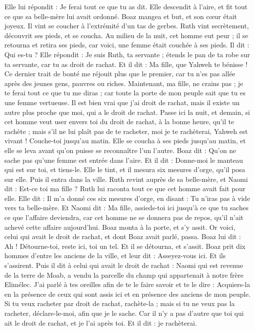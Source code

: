 \begin{multicols}{2}
Elle lui répondit : Je ferai tout ce que tu as dit.
Elle descendit à l'aire, et fit tout ce que sa belle-mère lui avait ordonné.
Boaz mangea et but, et son cœur était joyeux. Il vint se coucher à l'extrémité d'un tas de gerbes. Ruth vint secrètement, découvrit ses pieds, et se coucha.
Au milieu de la nuit, cet homme eut peur ; il se retourna et retira ses pieds, car voici, une femme était couchée à ses pieds.
Il dit : Qui es-tu ? Elle répondit : Je suis Ruth, ta servante ; étends le pan de ta robe sur ta servante, car tu as droit de rachat.
Et il dit : Ma fille, que Yahweh te bénisse ! Ce dernier trait de bonté me réjouit plus que le premier, car tu n'es pas allée après des jeunes gens, pauvres ou riches.
Maintenant, ma fille, ne crains pas ; je te ferai tout ce que tu me diras ; car toute la porte de mon peuple sait que tu es une femme vertueuse.
Il est bien vrai que j'ai droit de rachat, mais il existe un autre plus proche que moi, qui a le droit de rachat.
Passe ici la nuit, et demain, si cet homme veut user envers toi du droit de rachat, à la bonne heure, qu'il te rachète ; mais s'il ne lui plaît pas de te racheter, moi je te rachèterai, Yahweh est vivant ! Couche-toi jusqu'au matin.
Elle se coucha à ses pieds jusqu'au matin, et elle se leva avant qu'on puisse se reconnaître l'un l'autre. Boaz dit : Qu'on ne sache pas qu'une femme est entrée dans l'aire.
Et il dit : Donne-moi le manteau qui est sur toi, et tiens-le. Elle le tint, et il mesura six mesures d'orge, qu'il posa sur elle. Puis il entra dans la ville.
Ruth revint auprès de sa belle-mère, et Naomi dit : Est-ce toi ma fille ? Ruth lui raconta tout ce que cet homme avait fait pour elle.
Elle dit : Il m'a donné ces six mesures d'orge, en disant : Tu n'iras pas à vide vers ta belle-mère.
Et Naomi dit : Ma fille, assieds-toi ici jusqu'à ce que tu saches ce que l'affaire deviendra, car cet homme ne se donnera pas de repos, qu'il n'ait achevé cette affaire aujourd'hui.
\VerseOne{}Boaz monta à la porte, et s'y assit. Or voici, celui qui avait le droit de rachat, et dont Boaz avait parlé, passa. Boaz lui dit : Ah ! Détourne-toi, reste ici, toi un tel. Et il se détourna, et s'assit.
Boaz prit dix hommes d'entre les anciens de la ville, et leur dit : Asseyez-vous ici. Et ils s'assirent.
Puis il dit à celui qui avait le droit de rachat : Naomi qui est revenue de la terre de Moab, a vendu la parcelle du champ qui appartenait à notre frère Elimélec.
J'ai parlé à tes oreilles afin de te le faire savoir et te le dire : Acquiers-la en la présence de ceux qui sont assis ici et en présence des anciens de mon peuple. Si tu veux racheter par droit de rachat, rachète-la ; mais si tu ne veux pas la racheter, déclare-le-moi, afin que je le sache. Car il n'y a pas d'autre que toi qui ait le droit de rachat, et je l'ai après toi. Et il dit : je rachèterai.

\end{multicols}
